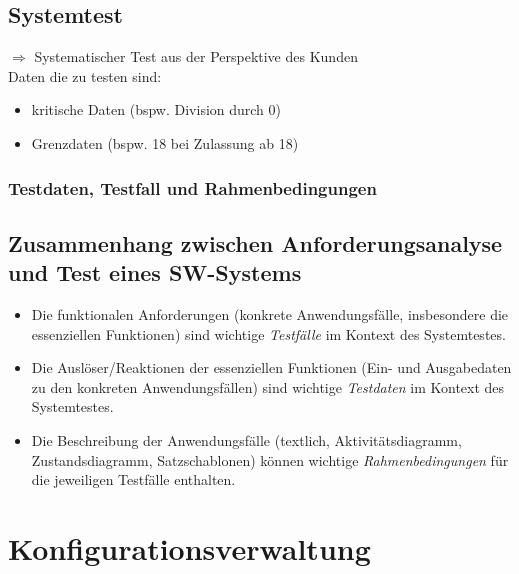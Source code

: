 \documentclass{scrreprt}
\begin{document}
\section{Systemtest}
$\Rightarrow$ Systematischer Test aus der Perspektive des Kunden\\
Daten die zu testen sind:
\begin{itemize}
\item kritische Daten (bspw. Division durch 0)
\item Grenzdaten (bspw. 18 bei Zulassung ab 18)
\end{itemize}

\subsection{Testdaten, Testfall und Rahmenbedingungen}

\section{Zusammenhang zwischen Anforderungsanalyse und Test eines SW-Systems}
\begin{itemize}
\item Die funktionalen Anforderungen (konkrete Anwendungsfälle, insbesondere die essenziellen Funktionen) sind wichtige \emph{Testfälle} im Kontext des Systemtestes.
\item Die Auslöser/Reaktionen der essenziellen Funktionen (Ein- und Ausgabedaten zu den konkreten Anwendungsfällen) sind wichtige \emph{Testdaten} im Kontext des Systemtestes.
\item Die Beschreibung der Anwendungsfälle (textlich, Aktivitätsdiagramm, Zustandsdiagramm, Satzschablonen) können wichtige \emph{Rahmenbedingungen} für die jeweiligen Testfälle enthalten.
\end{itemize}






\chapter{Konfigurationsverwaltung}
\end{document}
